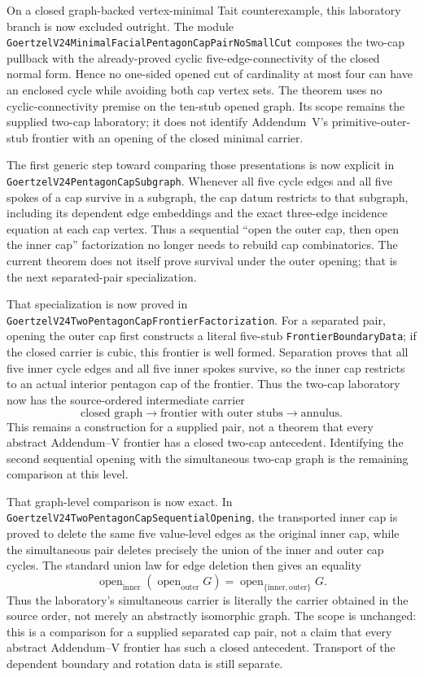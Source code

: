 \documentclass[11pt]{article}
\theoremstyle{definition}
\begin{document}
On a closed graph-backed vertex-minimal Tait counterexample, this laboratory
branch is now excluded outright.  The module
\texttt{GoertzelV24MinimalFacialPentagonCapPairNoSmallCut} composes the
two-cap pullback with the already-proved cyclic five-edge-connectivity of the
closed normal form.  Hence no one-sided opened cut of cardinality at most four
can have an enclosed cycle while avoiding both cap vertex sets.  The theorem
uses no cyclic-connectivity premise on the ten-stub opened graph.  Its scope
remains the supplied two-cap laboratory; it does not identify Addendum~V's
primitive-outer-stub frontier with an opening of the closed minimal carrier.

The first generic step toward comparing those presentations is now explicit
in \texttt{GoertzelV24PentagonCapSubgraph}.  Whenever all five cycle edges
and all five spokes of a cap survive in a subgraph, the cap datum restricts
to that subgraph, including its dependent edge embeddings and the exact
three-edge incidence equation at each cap vertex.  Thus a sequential
``open the outer cap, then open the inner cap'' factorization no longer needs
to rebuild cap combinatorics.  The current theorem does not itself prove
survival under the outer opening; that is the next separated-pair
specialization.

That specialization is now proved in
\texttt{GoertzelV24TwoPentagonCapFrontierFactorization}.  For a separated
pair, opening the outer cap first constructs a literal five-stub
\texttt{FrontierBoundaryData}; if the closed carrier is cubic, this frontier
is well formed.  Separation proves that all five inner cycle edges and all
five inner spokes survive, so the inner cap restricts to an actual interior
pentagon cap of the frontier.  Thus the two-cap laboratory now has the
source-ordered intermediate carrier
\[
  \text{closed graph}\longrightarrow\text{frontier with outer stubs}
  \longrightarrow\text{annulus}.
\]
This remains a construction for a supplied pair, not a theorem that every
abstract Addendum--V frontier has a closed two-cap antecedent.  Identifying
the second sequential opening with the simultaneous two-cap graph is the
remaining comparison at this level.

That graph-level comparison is now exact.  In
\texttt{GoertzelV24TwoPentagonCapSequentialOpening}, the transported inner
cap is proved to delete the same five value-level edges as the original inner
cap, while the simultaneous pair deletes precisely the union of the inner
and outer cap cycles.  The standard union law for edge deletion then gives
an equality
\[
  \operatorname{open}_{\mathrm{inner}}
    (\operatorname{open}_{\mathrm{outer}} G)
  =
  \operatorname{open}_{\{\mathrm{inner},\mathrm{outer}\}}G.
\]
Thus the laboratory's simultaneous carrier is literally the carrier obtained
in the source order, not merely an abstractly isomorphic graph.  The scope is
unchanged: this is a comparison for a supplied separated cap pair, not a
claim that every abstract Addendum--V frontier has such a closed antecedent.
Transport of the dependent boundary and rotation data is still separate.
\end{document}
